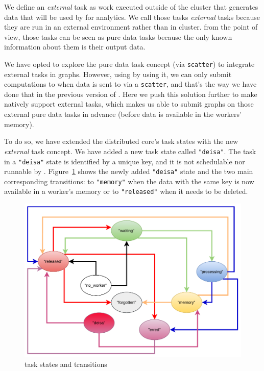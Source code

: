 We define an \textit{external} task as work executed outside of the \dask cluster that generates data that will be used by \dask for analytics.  
We call those tasks \textit{external} tasks because they are run in an external environment rather than in \dask cluster. from the \dask point of view, those tasks can be seen as pure data tasks because the only known information about them is their output data.  

We have opted to explore the pure data task concept (via \texttt{scatter}) to integrate external tasks in \dask graphs. However, using by using it, we can only submit computations to \dask when data is sent to \dask via a \texttt{scatter}, and that's the way we have done that in the previous version of \deisa. 
Here we push this solution further to make \dask natively support external tasks, which makes us able to submit graphs on those external pure data tasks in advance (before data is available in the workers' memory). 

To do so, we have extended the \dask distributed core's task states with the new \textit{external} task concept. We have added a new task state called \texttt{"deisa"}. The task in a \texttt{"deisa"} state is identified by a unique key, and it is not schedulable nor runnable by \dask. 
Figure~\ref{figdasktaskstate} shows the newly added \texttt{"deisa"} state and the two main corresponding transitions: to \texttt{"memory"} when the data with the same key is now available in a worker's memory or to \texttt{"released"} when it needs to be deleted. 

\begin{figure}[tb]\centering
\includegraphics[scale=0.8]{figures/Dask-TaskStatesSheduler.pdf}
\caption{\dask task states and transitions}
\label{figdasktaskstate}
\end{figure}

